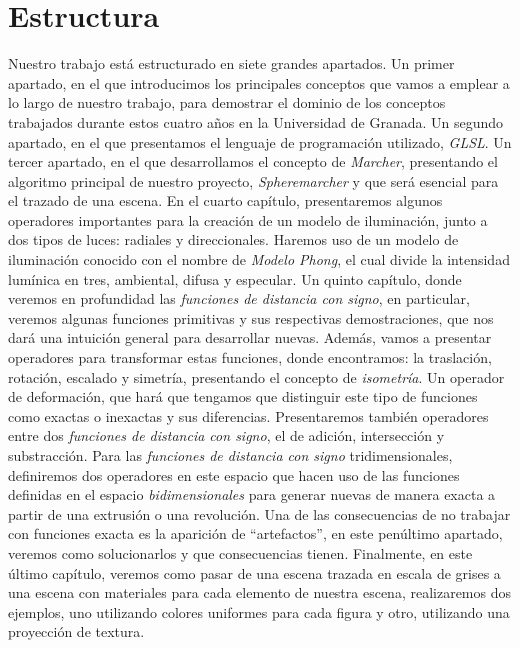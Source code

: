 \section*{Estructura}
Nuestro trabajo está estructurado en siete grandes apartados. Un primer apartado, en el que introducimos los principales conceptos que vamos a emplear a lo largo de nuestro trabajo, para demostrar el dominio de los conceptos trabajados durante estos cuatro años en la Universidad de Granada. Un segundo apartado, en el que presentamos el lenguaje de programación utilizado, \textit{GLSL}. Un tercer apartado, en el que desarrollamos el concepto de \textit{Marcher}, presentando el algoritmo principal de nuestro proyecto, \textit{Spheremarcher} y que será esencial para el trazado de una escena. En el cuarto capítulo, presentaremos algunos operadores importantes para la creación de un modelo de iluminación, junto a dos tipos de luces: radiales y direccionales. Haremos uso de un modelo de iluminación conocido con el nombre de \textit{Modelo Phong}, el cual divide la intensidad lumínica en tres, ambiental, difusa y especular. Un quinto capítulo, donde veremos en profundidad las \textit{funciones de distancia con signo}, en particular, veremos algunas funciones primitivas y sus respectivas demostraciones, que nos dará una intuición general para desarrollar nuevas. Además, vamos a presentar operadores para transformar estas funciones, donde encontramos: la traslación, rotación, escalado y simetría, presentando el concepto de \textit{isometría}. Un operador de deformación, que hará que tengamos que distinguir este tipo de funciones como exactas o inexactas y sus diferencias. Presentaremos también operadores entre dos \textit{funciones de distancia con signo}, el de adición, intersección y substracción. Para las \textit{funciones de distancia con signo} tridimensionales, definiremos dos operadores en este espacio que hacen uso de las funciones definidas en el espacio \textit{bidimensionales} para generar nuevas de manera exacta a partir de una extrusión o una revolución.
Una de las consecuencias de no trabajar con funciones exacta es la aparición de \enquote{artefactos}, en este penúltimo apartado, veremos como solucionarlos y que consecuencias tienen. Finalmente, en este último capítulo, veremos como pasar de una escena trazada en escala de grises a una escena con materiales para cada elemento de nuestra escena, realizaremos dos ejemplos, uno utilizando colores uniformes para cada figura y otro, utilizando una proyección de textura.\\\\